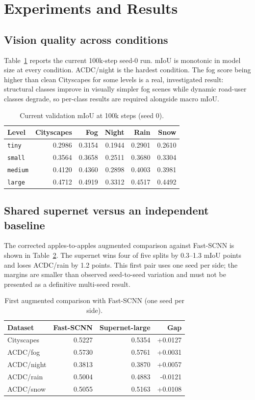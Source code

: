 \section{Experiments and Results}
\label{sec:experiments}

\subsection{Vision quality across conditions}
Table~\ref{tab:miou} reports the current 100k-step seed-0 run. mIoU is monotonic in model size at every condition. ACDC/night is the hardest condition. The fog score being higher than clean Cityscapes for some levels is a real, investigated result: structural classes improve in visually simpler fog scenes while dynamic road-user classes degrade, so per-class results are required alongside macro mIoU.

\begin{table}[t]
\caption{Current validation mIoU at 100k steps (seed 0).}
\label{tab:miou}
\centering
\begin{tabular}{lrrrrr}
\toprule
Level & Cityscapes & Fog & Night & Rain & Snow \\
\midrule
\texttt{tiny} & 0.2986 & 0.3154 & 0.1944 & 0.2901 & 0.2610 \\
\texttt{small} & 0.3564 & 0.3658 & 0.2511 & 0.3680 & 0.3304 \\
\texttt{medium} & 0.4120 & 0.4360 & 0.2898 & 0.4003 & 0.3981 \\
\texttt{large} & 0.4712 & 0.4919 & 0.3312 & 0.4517 & 0.4492 \\
\bottomrule
\end{tabular}
\end{table}

\subsection{Shared supernet versus an independent baseline}
The corrected apples-to-apples augmented comparison against Fast-SCNN is shown in Table~\ref{tab:baseline}. The supernet wins four of five splits by 0.3--1.3 mIoU points and loses ACDC/rain by 1.2 points. This first pair uses one seed per side; the margins are smaller than observed seed-to-seed variation and must not be presented as a definitive multi-seed result.

\begin{table}[t]
\caption{First augmented comparison with Fast-SCNN (one seed per side).}
\label{tab:baseline}
\centering
\begin{tabular}{lrrr}
\toprule
Dataset & Fast-SCNN & Supernet-large & Gap \\
\midrule
Cityscapes & 0.5227 & 0.5354 & +0.0127 \\
ACDC/fog & 0.5730 & 0.5761 & +0.0031 \\
ACDC/night & 0.3813 & 0.3870 & +0.0057 \\
ACDC/rain & 0.5004 & 0.4883 & -0.0121 \\
ACDC/snow & 0.5055 & 0.5163 & +0.0108 \\
\bottomrule
\end{tabular}
\end{table}

